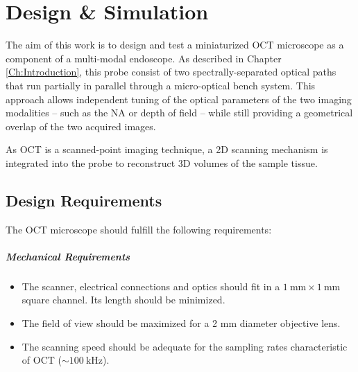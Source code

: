 %

\chapter{Design \& Simulation}
\label{Ch:DesignSimulation}	

The aim of this work is to design and test a miniaturized OCT microscope as a component of a multi-modal endoscope. As described in Chapter \ref{Ch:Introduction}, this probe consist of two spectrally-separated optical paths that run partially in parallel through a micro-optical bench system. This approach allows independent tuning of the optical parameters of the two imaging modalities -- such as the NA or depth of field -- while still providing a geometrical overlap of the two acquired images. 

As OCT is a scanned-point imaging technique, a 2D scanning mechanism is integrated into the probe to reconstruct 3D volumes of the sample tissue.

\section{Design Requirements}



The OCT microscope should fulfill the following requirements:

\paragraph{Mechanical Requirements} 
\begin{itemize}

\item The scanner, electrical connections and optics should fit in a $\SI{1}{\milli\meter} \times \SI{1}{\milli\meter}$ square channel. Its length should be minimized.
\item The field of view should be maximized for a 2 mm diameter objective lens.
\item The scanning speed should be adequate for the sampling rates characteristic of OCT ($\sim \SI{100}{\kilo\hertz} $).
\end{itemize}


